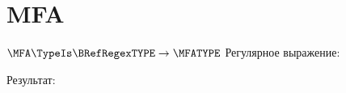 \section{MFA}
\begin{frame}{$\MFA\TypeIs\BRefRegexTYPE\to\MFATYPE$}
	Регулярное выражение:

	Результат:

\end{frame}